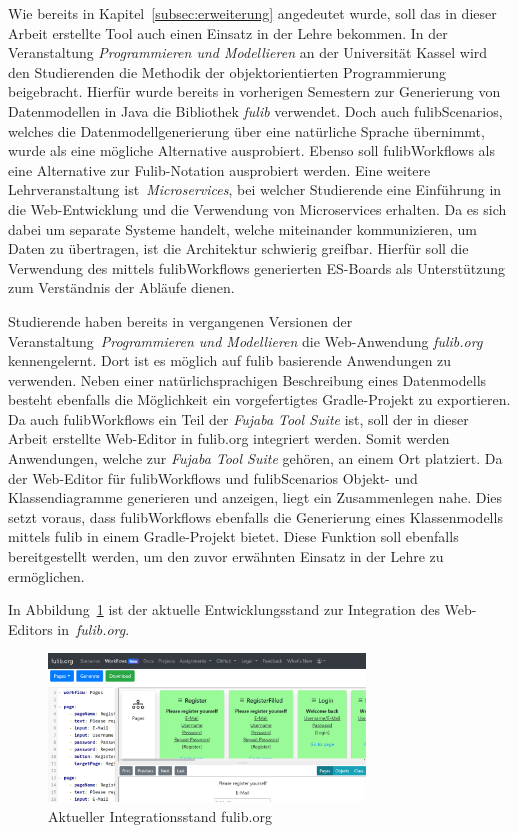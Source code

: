 Wie bereits in Kapitel~\ref{subsec:erweiterung} angedeutet wurde, soll das in dieser Arbeit erstellte Tool auch einen Einsatz in der Lehre bekommen.
In der Veranstaltung \textit{Programmieren und Modellieren} an der Universität Kassel wird den Studierenden die Methodik der objektorientierten Programmierung beigebracht.
Hierfür wurde bereits in vorherigen Semestern zur Generierung von Datenmodellen in Java die Bibliothek \textit{fulib} verwendet.
Doch auch fulibScenarios, welches die Datenmodellgenerierung über eine natürliche Sprache übernimmt, wurde als eine mögliche Alternative ausprobiert.
Ebenso soll fulibWorkflows als eine Alternative zur Fulib-Notation ausprobiert werden.
Eine weitere Lehrveranstaltung ist~\textit{Microservices}, bei welcher Studierende eine Einführung in die Web-Entwicklung und die Verwendung von
Microservices erhalten.
Da es sich dabei um separate Systeme handelt, welche miteinander kommunizieren, um Daten zu übertragen, ist die Architektur schwierig greifbar.
Hierfür soll die Verwendung des mittels fulibWorkflows generierten \ac{ES}-Boards als Unterstützung zum Verständnis der Abläufe dienen.

Studierende haben bereits in vergangenen Versionen der Veranstaltung~\textit{Programmieren und Modellieren} die Web-Anwendung \textit{fulib.org} kennengelernt.
Dort ist es möglich auf fulib basierende Anwendungen zu verwenden.
Neben einer natürlichsprachigen Beschreibung eines Datenmodells besteht ebenfalls die Möglichkeit ein vorgefertigtes Gradle-Projekt zu exportieren.
Da auch fulibWorkflows ein Teil der \textit{Fujaba Tool Suite} ist, soll der in dieser Arbeit erstellte Web-Editor in fulib.org integriert werden.
Somit werden Anwendungen, welche zur \textit{Fujaba Tool Suite} gehören, an einem Ort platziert.
Da der Web-Editor für fulibWorkflows und fulibScenarios Objekt- und Klassendiagramme generieren und anzeigen, liegt ein Zusammenlegen nahe.
Dies setzt voraus, dass fulibWorkflows ebenfalls die Generierung eines Klassenmodells mittels fulib in einem Gradle-Projekt bietet.
Diese Funktion soll ebenfalls bereitgestellt werden, um den zuvor erwähnten Einsatz in der Lehre zu ermöglichen.

In Abbildung~\ref{fig:fulibDotOrg} ist der aktuelle Entwicklungsstand zur Integration des Web-Editors in~\textit{fulib.org}.

\begin{figure}[h]
    \centering
    \includegraphics[width=0.75\textwidth]{images/5/fulibDotOrg}
    \caption{Aktueller Integrationsstand fulib.org}
    \label{fig:fulibDotOrg}
\end{figure}

